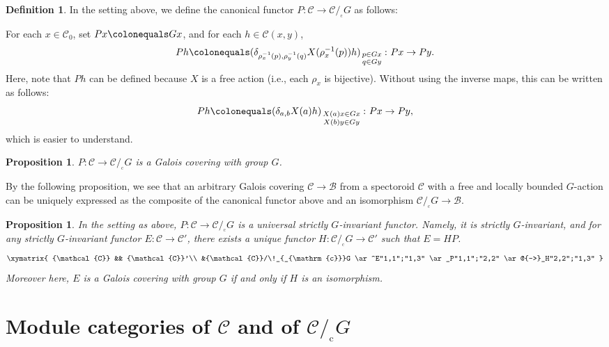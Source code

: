 \documentclass{surv-l}
\numberwithin{equation}{chapter}
\numberwithin{figure}{chapter}
\theoremstyle{plain}
\newtheorem{prp}[thm]{Proposition}
\theoremstyle{definition}
\newtheorem{dfn}[thm]{Definition}
\theoremstyle{remark}
\newcommand{\corbit}{/\!_{_{\mathrm{c}}}}
\begin{document}
\begin{dfn}\label{dfn:can-fun-free}
In the setting above,
we define the canonical functor $P \colon {\mathcal{C}} \to {\mathcal{C}}\corbit G$
as follows:

For each $x \in {\mathcal{C}}_0$, set $Px\colonequals  Gx$, and for each $h \in {\mathcal{C}}(x, y)$,
\[
Ph\colonequals  (\delta_{\rho_x^{-1}(p),\rho_y^{-1}(q)}X(\rho_x^{-1}(p))h)_{\begin{smallmatrix} p\in Gx \\q\in Gy \end{smallmatrix}}\colon Px \to Py.
\]
Here, note that $Ph$ can be defined because $X$ is a free action
(i.e., each $\rho_x$ is bijective).
Without using the inverse maps, this can be written as follows:
\[
Ph\colonequals  (\delta_{a,b}X(a)h)_{\begin{smallmatrix} X(a)x\in Gx \\X(b)y\in Gy \end{smallmatrix}}\colon Px \to Py,
\]
which is easier to understand.
\end{dfn}

\begin{prp}
$P \colon {\mathcal{C}} \to {\mathcal{C}}\corbit G$ is a Galois covering with group $G$.
\end{prp}

By the following proposition, we see that
an arbitrary Galois covering ${\mathcal{C}} \to \mathcal{B}$ from a spectoroid ${\mathcal{C}}$
with a free and locally bounded $G$-action can be uniquely expressed as
the composite of the canonical functor above and an isomorphism
${\mathcal{C}}\corbit G \to \mathcal{B}$.

\begin{prp}
In the setting as above,
$P \colon {\mathcal{C}} \to {\mathcal{C}}\corbit G$ is a universal strictly $G$-invariant functor.
Namely, it is strictly $G$-invariant, and for any
strictly $G$-invariant functor $E \colon {\mathcal{C}} \to {\mathcal{C}}'$,
there exists a unique functor $H \colon {\mathcal{C}}\corbit G \to {\mathcal{C}}'$
such that $E=HP$.
\[
\xymatrix{
{\mathcal{C}} && {\mathcal{C}}'\\
&{\mathcal{C}}\corbit G
\ar^E"1,1";"1,3"
\ar_P"1,1";"2,2"
\ar@{-->}_H"2,2";"1,3"
}
\]
Moreover here, $E$ is a Galois covering with group $G$ if and only if
$H$ is an isomorphism.
\end{prp}

\section{Module categories of ${\mathcal{C}}$ and of ${\mathcal{C}} \corbit G$}
\end{document}
